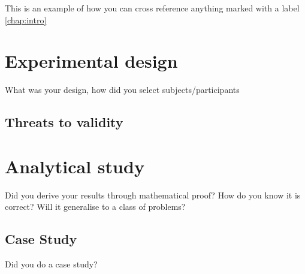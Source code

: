 This is an example of how you can cross reference anything marked with a label \ref{chap:intro}


\section{Experimental design}
What was your design, how did you select subjects/participants

\subsection{Threats to validity}

\section{Analytical study}

Did you derive your results through mathematical proof?
How do you know it is correct? Will it generalise to a class of problems?

\subsection{Case Study}

Did you do a case study?